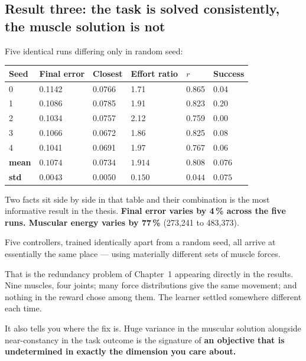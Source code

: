\subsection{Result three: the task is solved consistently, the muscle solution is not}

Five identical runs differing only in random seed:

\begin{center}
\begin{tabular}{@{} C{1.6cm} C{2.2cm} C{2.2cm} C{2.0cm} C{1.8cm} C{1.8cm} @{}}
\toprule
\textbf{Seed} & \textbf{Final error} & \textbf{Closest} & \textbf{Effort ratio} & \textbf{$r$} & \textbf{Success} \\
 & 0.1142 & 0.0766 & 1.71 & 0.865 & 0.04 \\
1 & 0.1086 & 0.0785 & 1.91 & 0.823 & 0.20 \\
2 & 0.1034 & 0.0757 & 2.12 & 0.759 & 0.00 \\
3 & 0.1066 & 0.0672 & 1.86 & 0.825 & 0.08 \\
4 & 0.1041 & 0.0691 & 1.97 & 0.767 & 0.06 \\
\midrule
\textbf{mean} & $0.1074$ & $0.0734$ & $1.914$ & $0.808$ & $0.076$ \\
\textbf{std}  & $0.0043$ & $0.0050$ & $0.150$ & $0.044$ & $0.075$ \\
\bottomrule
\end{tabular}
\end{center}

Two facts sit side by side in that table and their combination is the most
informative result in the thesis. \textbf{Final error varies by 4\,\% across the
five runs. Muscular energy varies by 77\,\%} (273{,}241 to 483{,}373).

\begin{plain}
Five controllers, trained identically apart from a random seed, all arrive at
essentially the same place --- using materially different sets of muscle forces.

That is the redundancy problem of Chapter~1 appearing directly in the results.
Nine muscles, four joints; many force distributions give the same movement; and
nothing in the reward chose among them. The learner settled somewhere different
each time.

It also tells you where the fix is. Huge variance in the muscular solution
alongside near-constancy in the task outcome is the signature of \textbf{an
objective that is undetermined in exactly the dimension you care about.}
\end{plain}

